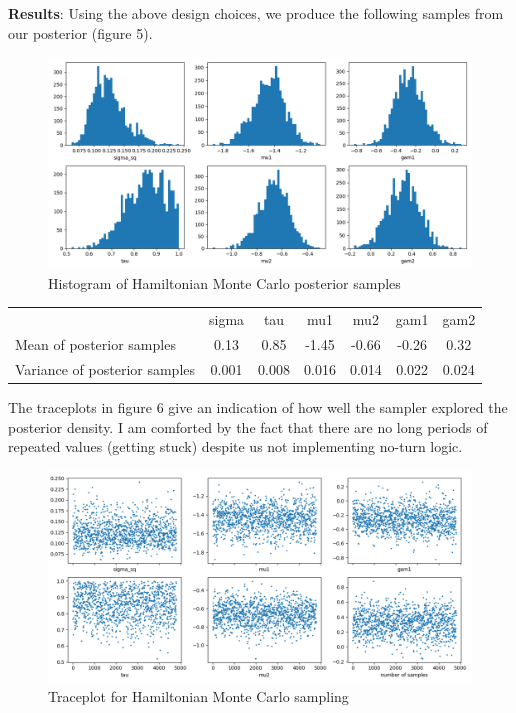 \documentclass[12pt,letterpaper,twoside]{article}
\begin{document}
\textbf{Results}: Using the above design choices, we produce the following 
samples from our posterior (figure 5).
\begin{figure}[H]
    \centering
    \includegraphics[scale=0.55]{gibbs_sampled_histogram.png}
    \caption{Histogram of Hamiltonian Monte Carlo posterior samples}
\end{figure}

\begin{table}[H]
    \begin{tabular}{lcccccc}
    \multicolumn{1}{c}{}          & sigma & tau   & mu1   & mu2   & gam1  & gam2  \\
    Mean of posterior samples     & 0.13  & 0.85  & -1.45 & -0.66 & -0.26 & 0.32  \\
    Variance of posterior samples & 0.001 & 0.008 & 0.016 & 0.014 & 0.022 & 0.024
    \end{tabular}
\end{table}

The traceplots in figure 6 give an indication of how well the sampler 
explored the posterior density. I am comforted by the fact that 
there are no long periods of repeated values (getting stuck) 
despite us not implementing no-turn logic. 
\begin{figure}[H]
    \centering
    \includegraphics[scale=0.55]{gibbs_sampled_traceplot.png}
    \caption{Traceplot for Hamiltonian Monte Carlo sampling}
\end{figure}
\end{document}
